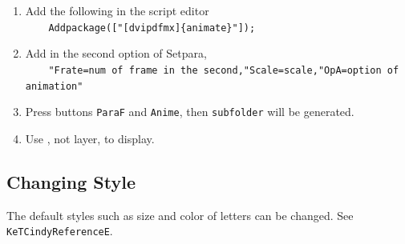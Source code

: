 \documentclass[papersize,a4paper,12pt]{article}
\begin{document}
\begin{enumerate}[1)]
\item Add the following in the script editor\\ 
\verb|    Addpackage(["[dvipdfmx]{animate}"]);|
\item Add in the second option of Setpara,\\
\verb|    "Frate=num of frame in the second,"Scale=scale,"OpA=option of animation" |
\item Press buttons \verb|ParaF| and \verb|Anime|, then \verb|subfolder| will be generated.
\item Use \verb||, not layer, to display.
\end{enumerate}

\subsection{Changing Style}

The default styles such as size and color of letters can be changed.
See \verb|KeTCindyReferenceE|.
\end{document}
